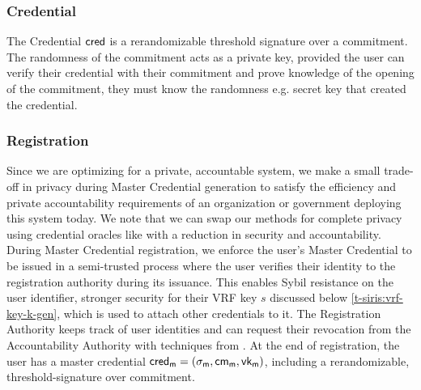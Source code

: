 \subsubsection*{Credential}
The Credential $\mathsf{cred}$ is a rerandomizable threshold signature over a commitment. The randomness of the commitment acts as a private key, provided the user can verify their credential with their commitment and prove knowledge of the opening of the commitment, they must know the randomness e.g. secret key that created the credential. 


\subsubsection*{Registration}
Since we are optimizing for a private, accountable system, we make a small trade-off in privacy during Master Credential generation to satisfy the efficiency and private accountability requirements of an organization or government deploying this system today. We note that we can swap our methods for complete privacy using credential oracles like \cite{zhang_deco_2020, celi_distefano_2025, baldimtsi_zklogin_2024, ritzdorf_tls-n_2018} with a reduction in security and accountability.
During Master Credential registration, we enforce the user's Master Credential to be issued in a semi-trusted process where the user verifies their identity to the registration authority during its issuance. This enables Sybil resistance on the user identifier, stronger security for their VRF key $s$ discussed below \ref{t-siris:vrf-key-k-gen}, which is used to attach other credentials to it. The Registration Authority keeps track of user identities and can request their revocation from the Accountability Authority with techniques from \cite{damgard_balancing_2020}. At the end of registration, the user has a master credential $\mathsf{cred_m} = (\sigma_{\mathsf{m}}, \mathsf{cm_m}, \mathsf{vk_m})$, including a rerandomizable, threshold-signature over commitment.


